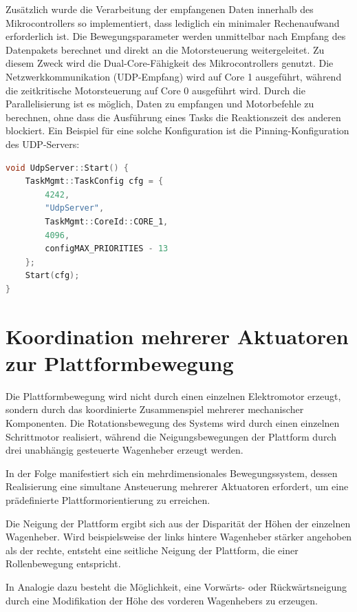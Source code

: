 Zusätzlich wurde die Verarbeitung der empfangenen Daten innerhalb des Mikrocontrollers so implementiert, dass lediglich ein minimaler Rechenaufwand erforderlich ist. Die Bewegungsparameter werden unmittelbar nach Empfang des Datenpakets berechnet und direkt an die Motorsteuerung weitergeleitet. Zu diesem Zweck wird die Dual-Core-Fähigkeit des Mikrocontrollers genutzt. Die Netzwerkkommunikation (UDP-Empfang) wird auf Core 1 ausgeführt, während die zeitkritische Motorsteuerung auf Core 0 ausgeführt wird. Durch die Parallelisierung ist es möglich, Daten zu empfangen und Motorbefehle zu berechnen, ohne dass die Ausführung eines Tasks die Reaktionszeit des anderen blockiert. Ein Beispiel für eine solche Konfiguration ist die Pinning-Konfiguration des UDP-Servers:
\begin{lstlisting}[language=C++, caption={Pinning-Konfiguration des UDP-Servers}, label={lst:pinning_function_udp_server}]
void UdpServer::Start() {
    TaskMgmt::TaskConfig cfg = { 
        4242,
        "UdpServer",
        TaskMgmt::CoreId::CORE_1, 
        4096, 
        configMAX_PRIORITIES - 13 
    };    
    Start(cfg);
}
\end{lstlisting}

\section{Koordination mehrerer Aktuatoren zur Plattformbewegung}
Die Plattformbewegung wird nicht durch einen einzelnen Elektromotor erzeugt, sondern durch das koordinierte Zusammenspiel mehrerer mechanischer Komponenten. Die Rotationsbewegung des Systems wird durch einen einzelnen Schrittmotor realisiert, während die Neigungsbewegungen der Plattform durch drei unabhängig gesteuerte Wagenheber erzeugt werden.

In der Folge manifestiert sich ein mehrdimensionales Bewegungssystem, dessen Realisierung eine simultane Ansteuerung mehrerer Aktuatoren erfordert, um eine prädefinierte Plattformorientierung zu erreichen. \cite{Merlet2008}

Die Neigung der Plattform ergibt sich aus der Disparität der Höhen der einzelnen Wagenheber. Wird beispielsweise der links hintere Wagenheber stärker angehoben als der rechte, entsteht eine seitliche Neigung der Plattform, die einer Rollenbewegung entspricht.

In Analogie dazu besteht die Möglichkeit, eine Vorwärts- oder Rückwärtsneigung durch eine Modifikation der Höhe des vorderen Wagenhebers zu erzeugen.

